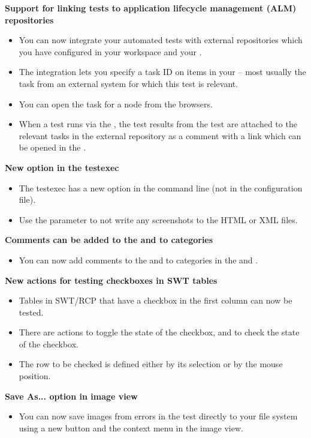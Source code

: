 \textbf{Support for linking tests to application lifecycle management (ALM) repositories}
\begin{itemize}
\item You can now integrate your automated tests with external repositories which you have configured in your workspace and your \gdproject{}.
\item The integration lets you specify a task ID on items in your \gdproject{} -- most usually the task from an external system for which this test is relevant. 
\item You can open the task for a node from the browsers. 
\item When a test runs via the \ite{}, the test results from the test are attached to the relevant tasks in the external repository as a comment with a link which can be opened in the \dash{}. 
\end{itemize}

\textbf{New option in the testexec}
\begin{itemize}
\item The testexec has a new option in the command line (not in the configuration file).
\item Use the parameter  to not write any screenshots to the HTML or XML files.
\end{itemize}

\textbf{Comments can be added to the \gdproject{} and to categories}
\begin{itemize}
\item You can now add comments to the \gdproject{} and to categories in the \gdtestsuitebrowser{} and \gdtestcasebrowser{}.
\end{itemize}

\textbf{New actions for testing checkboxes in SWT tables}
\begin{itemize}
\item Tables in SWT/RCP \gdauts{} that have a checkbox in the first column can now be tested.
\item There are actions to toggle the state of the checkbox, and to check the state of the checkbox.
\item The row to be checked is defined either by its selection or by the mouse position.
\end{itemize}

\textbf{Save As... option in image view}
\begin{itemize}
\item You can now save images from errors in the test directly to your file system  using a new button and the context menu in the image view.
\end{itemize}

